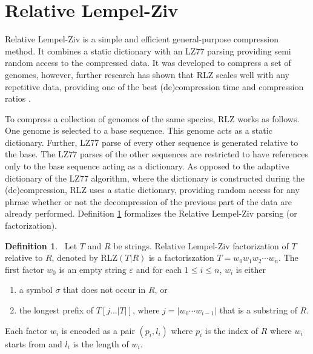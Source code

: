 \documentclass[english,twoside,censored,csm,algorithms-track-2020]{HYthesisML}
\theoremstyle{plain}
\theoremstyle{definition}
\newtheorem{definition}[theorem]{Definition}
\begin{document}
\section{Relative Lempel-Ziv}

Relative Lempel-Ziv is a simple and efficient \citep{Deorowicz11} general-purpose \citep{Hoobin11}
compression method. It combines a static dictionary with an LZ77 parsing providing semi random
access to the compressed data. It was developed to compress a set of genomes, however, further
research has shown that RLZ scales well with any repetitive data, providing
one of the best (de)compression time and compression ratios \citep{Gagie16}.

To compress a collection of genomes of the same species, RLZ works as follows. One genome is selected
to a base sequence. This genome acts as a static dictionary. Further, LZ77 parse of every other sequence
is generated relative to the base. The LZ77 parses of the other sequences are restricted to have
references only to the base sequence acting as a dictionary. As opposed to the adaptive dictionary
of the LZ77 algorithm, where the dictionary is constructed during the (de)compression, RLZ uses
a static dictionary, providing random access for any phrase whether or not the decompression
of the previous part of the data are already performed. Definition \ref{def-rlz} formalizes the
Relative Lempel-Ziv parsing (or factorization).




\begin{definition}~\label{def-rlz}
  Let $T$ and $R$ be strings. Relative Lempel-Ziv factorization of $T$ relative to $R$, denoted by
  RLZ$(T|R)$ is a factoriszation $T=w_0w_1w_2\cdots w_n$. The first factor $w_0$ is an empty string
  $\varepsilon$ and for each $1\leq i \leq n$, $w_i$ is either
  \begin{enumerate}
  \item a symbol $\sigma$ that does not occur in $R$, or
  \item the longest prefix of $T[j...|T|]$, where $j = |w_0\cdots w_{i-1}|$ that is a substring of $R$.
  \end{enumerate}
  Each factor $w_i$ is encoded as a pair $(p_i,l_i)$ where $p_i$ is the index of $R$ where $w_i$
  starts from and $l_i$ is the length of $w_i$.
\end{definition}
\end{document}
